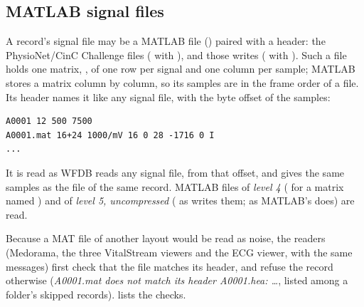 \subsection{MATLAB signal files}
\label{sec:wfdb-mat}

A record's signal file may be a MATLAB file () paired with a header: the
PhysioNet/CinC Challenge files ( with ), and those
 writes ( with ). Such a file holds one matrix,
, of one row per signal and one column per sample; MATLAB stores a matrix column by
column, so its samples are in the frame order of a  file. Its header names it like any
signal file, with the byte offset of the samples:

\begin{lstlisting}[style=text]
A0001 12 500 7500
A0001.mat 16+24 1000/mV 16 0 28 -1716 0 I
...
\end{lstlisting}

It is read as WFDB reads any signal file, from that offset, and gives the same samples as the
 file of the same record. MATLAB files of \emph{level 4} ( for a matrix named
) and of \emph{level 5, uncompressed} ( as  writes them;
 as MATLAB's  does) are read.

Because a MAT file of another layout would be read as noise, the readers (Medorama, the three
VitalStream viewers and the ECG viewer, with the same messages) first check that the file
matches its header, and refuse the record otherwise (\emph{A0001.mat does not match its header
A0001.hea: \dots}, listed among a folder's skipped records).  lists the checks.

